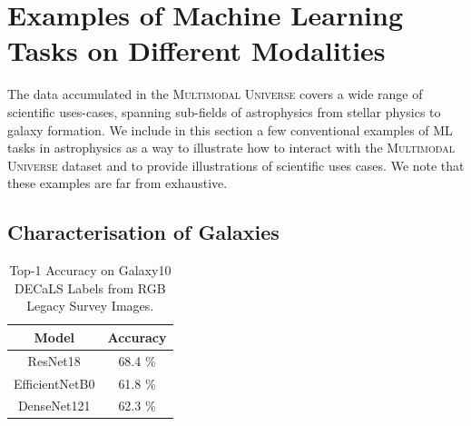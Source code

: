 \documentclass[dvipsnames,table]{article}
\newcommand\pile{\textsc{Multimodal Universe}\xspace}
\newcommand{\FL}[1]{{\color{magenta}FL: #1}}
\newcommand{\MB}[1]{{\color{violet}MB: #1}}
\begin{document}

\section{Examples of Machine Learning Tasks on Different Modalities}

The data accumulated in the \pile covers a wide range of scientific uses-cases, spanning sub-fields of astrophysics from stellar physics to galaxy formation. We include in this section a few conventional examples of ML tasks in astrophysics as a way to illustrate how to interact with the \pile dataset and to provide illustrations of scientific uses cases. We note that these examples are far from exhaustive.

\subsection{Characterisation of Galaxies}
\label{app:gals}
\begin{table}
    \begin{threeparttable}
    \centering
    \begin{tabular}{c c}
        \toprule
        \cellcolor{white} \small Model & Accuracy
         \\\midrule
          \small ResNet18 \citep{he2016deep} &  68.4 \%\\
         \small EfficientNetB0 \citep{efficientnet} & 61.8 \% \\
         \small DenseNet121 \citep{huang2017densely} & 62.3 \%  \\
        \bottomrule
    \end{tabular}
    \caption{{\small Top-1 Accuracy on Galaxy10 DECaLS Labels from RGB Legacy Survey Images.}}
    \label{tab:morphology_classification}
    \end{threeparttable}
\end{table}
\end{document}
